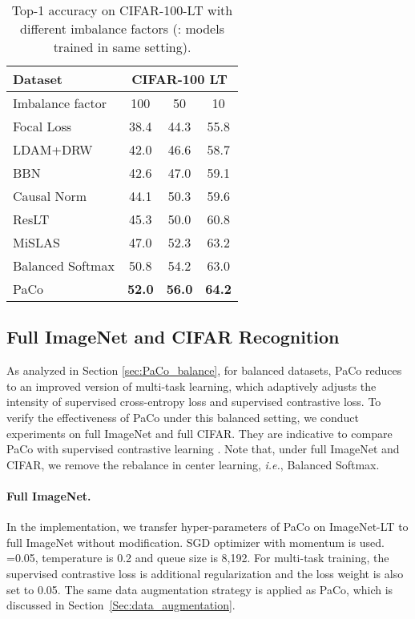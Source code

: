\documentclass[10pt,twocolumn,letterpaper]{article}
\begin{document}
\begin{table}[t]
\centering
	\caption{Top-1 accuracy on CIFAR-100-LT with different imbalance factors (\dag: models trained in same setting).}
	\resizebox{.68\linewidth}{!}
	{
		\begin{tabular}{l  c  c  c}
			\toprule
			Dataset & \multicolumn{3}{c}{CIFAR-100 LT} \\ 
			\midrule
			Imbalance factor &100 &50 & 10 \\
			\midrule
			Focal Loss  & 38.4 & 44.3 & 55.8 \\
			LDAM+DRW    & 42.0 & 46.6 & 58.7 \\
			BBN         & 42.6 & 47.0 & 59.1 \\
			Causal Norm & 44.1 & 50.3 & 59.6 \\
			ResLT       & 45.3 & 50.0 & 60.8 \\
			MiSLAS      & 47.0 & 52.3 & 63.2 \\
			\midrule
			
			Balanced Softmax \dag &50.8 &54.2 &63.0 \\
			PaCo \dag    &\textbf{52.0} &\textbf{56.0} &\textbf{64.2} \\
			\bottomrule
		\end{tabular}
	}
	\label{tab:cifar100_main}
\end{table}

\subsection{Full ImageNet and CIFAR Recognition}
As analyzed in Section \ref{sec:PaCo_balance}, for balanced datasets, PaCo reduces to an improved version of multi-task learning, which adaptively adjusts the intensity of supervised cross-entropy loss and supervised contrastive loss. To verify the effectiveness of PaCo under this balanced setting, we conduct experiments on full ImageNet and full CIFAR. They are indicative to compare PaCo with supervised contrastive learning \cite{DBLP:conf/nips/KhoslaTWSTIMLK20}. Note that, under full ImageNet and CIFAR, we remove the rebalance in center learning, {\it i.e.}, Balanced Softmax.

\paragraph{Full ImageNet.}
In the implementation, we transfer hyper-parameters of PaCo on ImageNet-LT to full ImageNet without modification. SGD optimizer with momentum  is used. =0.05, temperature is 0.2 and queue size is 8,192. For multi-task training, the supervised contrastive loss is additional regularization and the loss weight is also set to 0.05.
The same data augmentation strategy is applied as PaCo, which is discussed in Section~\ref{Sec:data_augmentation}. 
\end{document}
